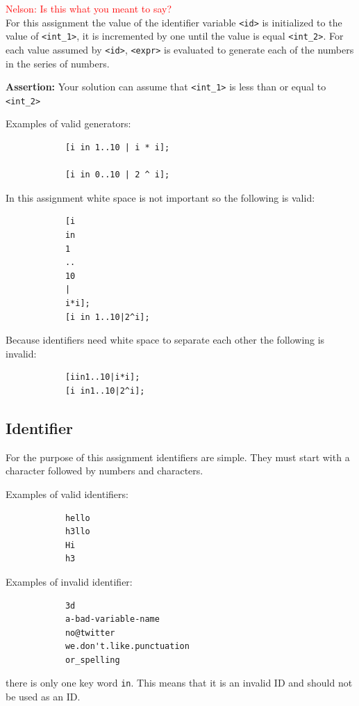 \documentclass{article}
\newcommand{\code}[1]{\texttt{\textmd{#1}}}
\newcommand{\nelson}[1]{\noindent\textcolor{red}{Nelson: {#1}}}
\newcommand{\nelson}[1]{}
\begin{document}
\nelson{Is this what you meant to say?\\}
                 For this assignment the value of the identifier variable \code{<id>} is initialized to the value of \code{<int\_1>}, it is incremented by one until the value is equal \code{<int\_2>}. For each value assumed by \code{<id>}, \code{<expr>} is evaluated to generate each of the numbers in the series of numbers.
		
		\textbf{Assertion:} Your solution can assume that \code{<int\_1>} is less than or equal to \code{<int\_2>}
		
		Examples of valid generators:

		\begin{lstlisting}
			[i in 1..10 | i * i];
			
			[i in 0..10 | 2 ^ i];
		\end{lstlisting}

		In this assignment white space is not important so the following is valid:

		\begin{lstlisting}
			[i
			in
			1
			..
			10
			|
			i*i];
			[i in 1..10|2^i];
		\end{lstlisting}

		Because identifiers need white space to separate each other the following is invalid:

		\begin{lstlisting}
			[iin1..10|i*i];
			[i in1..10|2^i];
		\end{lstlisting}


	\subsection{Identifier}
		For the purpose of this assignment identifiers are simple. They must start with a character followed by
		numbers and characters.
		
		Examples of valid identifiers:

		\begin{lstlisting}
			hello
			h3llo
			Hi
			h3
		\end{lstlisting}

		Examples of invalid identifier:

		\begin{lstlisting}
			3d
			a-bad-variable-name
			no@twitter
			we.don't.like.punctuation
			or_spelling
		\end{lstlisting}

		there is only one key word \texttt{in}. This means that it is an invalid ID and should not be used as an ID.
\end{document}
